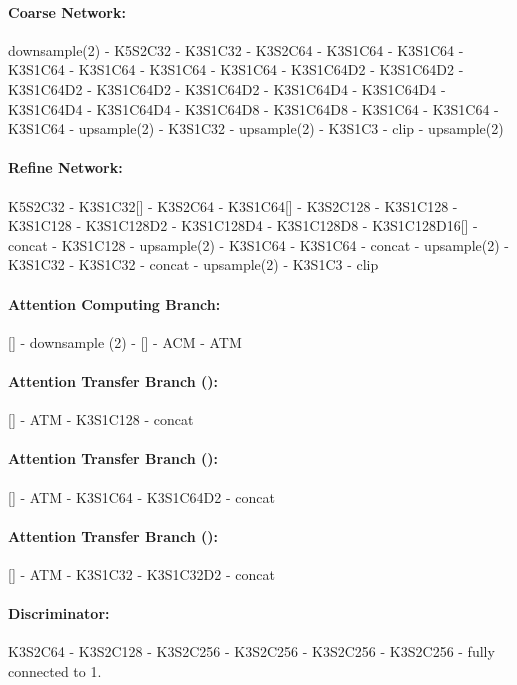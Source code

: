 \documentclass[oribibl]{llncs}  \usepackage[width=122mm,left=12mm,paperwidth=146mm,height=193mm,top=12mm,paperheight=217mm]{geometry}
\begin{document}
\paragraph{Coarse Network:}
downsample(2) - K5S2C32 - K3S1C32 - K3S2C64 - K3S1C64 - K3S1C64 - K3S1C64 - K3S1C64 - K3S1C64 - K3S1C64 - K3S1C64D2 - K3S1C64D2 - K3S1C64D2 - K3S1C64D2 - K3S1C64D2 - K3S1C64D4 - K3S1C64D4 - K3S1C64D4 - K3S1C64D4 - K3S1C64D8 - K3S1C64D8 - K3S1C64 - K3S1C64 - K3S1C64 - upsample(2) - K3S1C32 - upsample(2) - K3S1C3 - clip - upsample(2)

\paragraph{Refine Network:}
K5S2C32 - K3S1C32[] - K3S2C64 - K3S1C64[] - K3S2C128 - K3S1C128 - K3S1C128 - K3S1C128D2 - K3S1C128D4 - K3S1C128D8 - K3S1C128D16[] - concat - K3S1C128 - upsample(2) - K3S1C64 - K3S1C64 - concat - upsample(2) - K3S1C32 - K3S1C32 - concat - upsample(2) - K3S1C3 - clip


\paragraph{Attention Computing Branch:}
[] - downsample (2) - [] - ACM - ATM

\paragraph{Attention Transfer Branch ():}
[] - ATM - K3S1C128 - concat


\paragraph{Attention Transfer Branch ():}
[] - ATM - K3S1C64 - K3S1C64D2 - concat

\paragraph{Attention Transfer Branch ():}
[] - ATM - K3S1C32 - K3S1C32D2 - concat

\paragraph{Discriminator: }
K3S2C64 - K3S2C128 - K3S2C256 - K3S2C256 - K3S2C256 - K3S2C256 - fully connected to 1.
\end{document}
